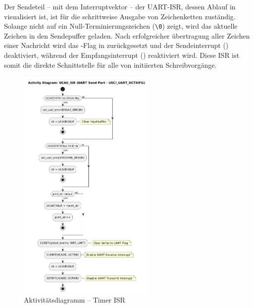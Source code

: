 \newpage
Der Sendeteil -- mit dem Interruptvektor  -- der UART-ISR, dessen Ablauf in  visualisiert ist, ist f\"ur die schrittweise Ausgabe von Zeichenketten zust\"andig. Solange  nicht auf ein Null-Terminierungszeichen (\grq{}\texttt{\textbackslash 0}\grq{}) zeigt, wird das aktuelle Zeichen in den Sendepuffer  geladen. Nach erfolgreicher \"ubertragung aller Zeichen einer Nachricht wird das -Flag in  zur\"uckgesetzt und der Sendeinterrupt () deaktiviert, w\"ahrend der Empfangsinterrupt () reaktiviert wird. Diese ISR ist somit die direkte Schnittstelle f\"ur alle von  initiierten Schreibvorg\"ange.

\begin{figure}[h!]
	\centering
	\includegraphics[width=0.60\textwidth]{../Bilder/observer_activity_diagram_eusci_send.png}
	\caption{Aktivit\"atsdiagramm -- Timer ISR}
	\label{fig:activity_diagram_uart_isr_send}
\end{figure}

